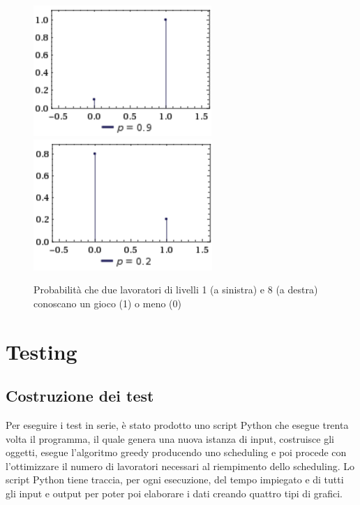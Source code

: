      \begin{figure}[!htb]
         \begin{widepage}
             \centering
             \includegraphics[width=.49\textwidth]{../immagini/livello_1.png}\hfil
             \includegraphics[width=.49\textwidth]{../immagini/livello_8.png}
             \caption{Probabilità che due lavoratori di livelli 1 (a sinistra) e 8 (a destra) conoscano un gioco (1) o meno (0)}
         \end{widepage}
     \end{figure}
 \clearpage
\section{Testing}
\subsection{Costruzione dei test}
Per eseguire i test in serie, è stato prodotto uno script Python che esegue trenta volta il programma, il quale genera una nuova istanza di input, costruisce gli oggetti, esegue l'algoritmo greedy producendo uno scheduling e poi procede con l'ottimizzare il numero di lavoratori necessari al riempimento dello scheduling. Lo script Python tiene traccia, per ogni esecuzione, del tempo impiegato e di tutti gli input e output per poter poi elaborare i dati creando quattro tipi di grafici.
